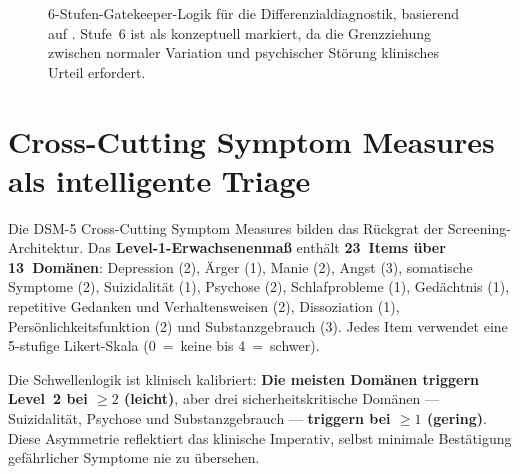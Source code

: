 \documentclass[11pt,a4paper]{article}
\begin{document}
\begin{figure}[ht]
\caption{6-Stufen-Gatekeeper-Logik f\"ur die Differenzialdiagnostik, basierend auf \citet{First2024}. Stufe~6 ist als konzeptuell markiert, da die Grenzziehung zwischen normaler Variation und psychischer St\"orung klinisches Urteil erfordert.}
\label{fig:gatekeeper}
\end{figure}


\section{Cross-Cutting Symptom Measures als intelligente Triage}
\label{sec:screening}

Die DSM-5 Cross-Cutting Symptom Measures bilden das R\"uckgrat der Screening-Architektur. Das \textbf{Level-1-Erwachsenenma\ss{}} enth\"alt \textbf{23~Items \"uber 13~Dom\"anen}: Depression (2), \"Arger (1), Manie (2), Angst (3), somatische Symptome (2), Suizidalit\"at (1), Psychose (2), Schlafprobleme (1), Ged\"achtnis (1), repetitive Gedanken und Verhaltensweisen (2), Dissoziation (1), Pers\"onlichkeitsfunktion (2) und Substanzgebrauch (3). Jedes Item verwendet eine 5-stufige Likert-Skala (0~=~keine bis 4~=~schwer).

Die Schwellenlogik ist klinisch kalibriert: \textbf{Die meisten Dom\"anen triggern Level~2 bei $\geq 2$ (leicht)}, aber drei sicherheitskritische Dom\"anen --- Suizidalit\"at, Psychose und Substanzgebrauch --- \textbf{triggern bei $\geq 1$ (gering)}. Diese Asymmetrie reflektiert das klinische Imperativ, selbst minimale Best\"atigung gef\"ahrlicher Symptome nie zu \"ubersehen.
\end{document}
